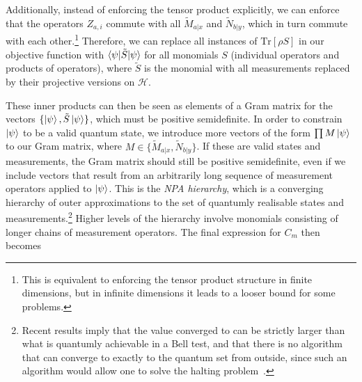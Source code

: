 \documentclass[10pt, a4paper]{article}
\numberwithin{equation}{section} %
\theoremstyle{definition}
\theoremstyle{plain}
\newcommand{\?}{\mathrel{?}} %
\newcommand{\Tr}{\mathrm{Tr}} %
\newcommand{\Hs}{\mathcal{H}} %
\begin{document}
      Additionally, instead of enforcing the tensor product explicitly, we can enforce that the operators \(Z_{a,i}\) commute with all \(\tilde{M}_{a|x}\) and \(\tilde{N}_{b|y}\), which in turn commute with each other.\footnote{This is equivalent to enforcing the tensor product structure in finite dimensions, but in infinite dimensions it leads to a looser bound for some problems.} Therefore, we can replace all instances of \(\Tr\left[\rho S\right]\) in our objective function with \(\braket{\psi|\tilde{S}|\psi}\) for all monomials \(S\) (individual operators and products of operators), where \(\tilde{S}\) is the monomial with all measurements replaced by their projective versions on \(\Hs\). 

      These inner products can then be seen as elements of a Gram matrix for the vectors \(\{\ket{\psi}, \tilde{S}\ket{\psi}\}\), which must be positive semidefinite. In order to constrain \(\ket{\psi}\) to be a valid quantum state, we introduce more vectors of the form \(\prod M\ket{\psi}\) to our Gram matrix, where \(M \in \{\tilde{M}_{a|x}, \tilde{N}_{b|y}\}\). If these are valid states and measurements, the Gram matrix should still be positive semidefinite, even if we include vectors that result from an arbitrarily long sequence of measurement operators applied to \(\ket{\psi}\). This is the \emph{NPA hierarchy}, which is a converging hierarchy of outer approximations to the set of quantumly realisable states and measurements.\footnote{Recent results imply that the value converged to can be strictly larger than what is quantumly achievable in a Bell test, and that there is no algorithm that can converge to exactly to the quantum set from outside, since such an algorithm would allow one to solve the halting problem~\cite{MIPRE}.} Higher levels of the hierarchy involve monomials consisting of longer chains of measurement operators. The final expression for \(C_m\) then becomes
\end{document}
